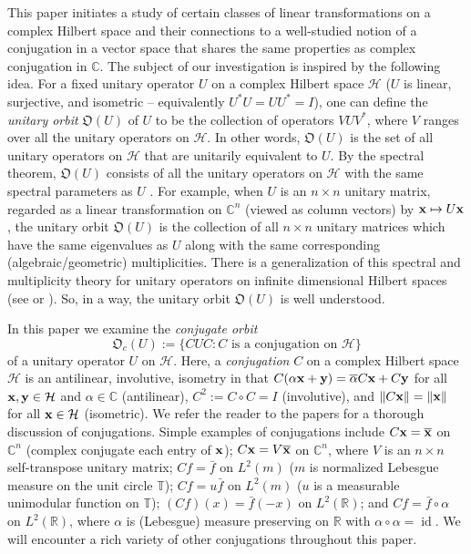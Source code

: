 \documentclass{dis}
\theoremstyle{plain}
\theoremstyle{definition}
\def\C{\mathbb{C}}
\def\R{\mathbb{R}}
\def\T{\mathbb{T}}
\newcommand{\h}{\mathcal{H}}
\renewcommand{\vec}[1]{{\bf #1}}
\newcommand{\0}{{\color{lightgray}0}}
\begin{document}
This paper initiates a study of certain classes of linear transformations on a complex Hilbert space and their connections to a well-studied notion of a conjugation in a vector space that shares the same properties as complex conjugation in $\C$. The subject of our investigation is inspired by the following idea. 
For a fixed unitary operator  $U$ on a complex Hilbert space $\mathcal{H}$  ($U$ is linear, surjective, and isometric -- equivalently $U^{*} U = U U^{*} = I$), one can define the {\em unitary orbit} $\mathfrak{O}(U)$ of $U$
 to be the collection of operators $V U V^{*}$, where $V$ ranges over all the unitary operators on  $\mathcal{H}$. In other words, $\mathfrak{O}(U)$ is the set of all unitary operators on $\mathcal{H}$ that are unitarily equivalent to $U$. By the spectral theorem, $\mathfrak{O}(U)$ consists of all the unitary operators  on $\mathcal{H}$ with the same spectral parameters as $U$ \cite[Ch.~IX]{ConwayFA}. For example, when $U$ is an $n \times n$ unitary matrix, regarded as a linear transformation on $\C^n$ (viewed as column vectors) by $\vec{x} \mapsto U \vec{x}$, the unitary orbit $\mathfrak{O}(U)$ is the collection of all $n \times n$ unitary matrices which have the same eigenvalues as $U$ along with the same corresponding (algebraic/geometric) multiplicities. There is a generalization of this spectral and multiplicity theory for unitary operators on infinite dimensional Hilbert spaces (see \cite{ConwayFA} or \cite{MR0045309}). So, in a way, the unitary orbit $\mathfrak{O}(U)$ is well understood. 

In this paper we examine the {\em conjugate orbit}
$$\mathfrak{O}_c(U) := \{C U C: \mbox{$C$ is a conjugation on $\h$}\}$$
of a unitary operator $U$ on $\mathcal{H}$.
Here, a {\em conjugation} $C$ on a complex Hilbert space $\mathcal{H}$ is an antilinear,  involutive, isometry in that
$C(\alpha \vec{x} + \vec{y}) = \overline{\alpha} C \vec{x} + C \vec{y}$ for all $\vec{x}, \vec{y} \in \mathcal{H}$ and $\alpha \in \C$ (antilinear), $C^2 := C \circ C = I$ (involutive), and $\|C \vec{x}\| = \|\vec{x}\|$ for all $\vec{x} \in \mathcal{H}$ (isometric). We refer the reader to the papers \cite{MR2187654, MR2302518, MR2749452, MR4747045, MR4745001} for a thorough discussion of conjugations. Simple examples of conjugations include $C \vec{x} = \overline{\vec{x}}$ on $\C^{n}$ (complex conjugate each entry of $\vec{x}$); $C \vec{x} = V \overline{\vec{x}}$ on $\C^{n}$, where $V$ is an $n \times n$  self-transpose unitary matrix; $C f = \bar f$ on $L^2(m)$ ($m$ is normalized Lebesgue measure on the unit circle $\T$); $C f = u \bar f$ on $L^2(m)$ ($u$ is a measurable unimodular function on $\T$);  $(C f)(x) = \bar f(-x)$ on $L^2(\R)$; and $C f = \bar f \circ \alpha$ on $L^2(\R)$, where $\alpha$ is (Lebesgue) measure preserving on $\R$ with $\alpha \circ \alpha = \operatorname{id}$. We will encounter a rich variety of other conjugations throughout this paper. 
\end{document}
